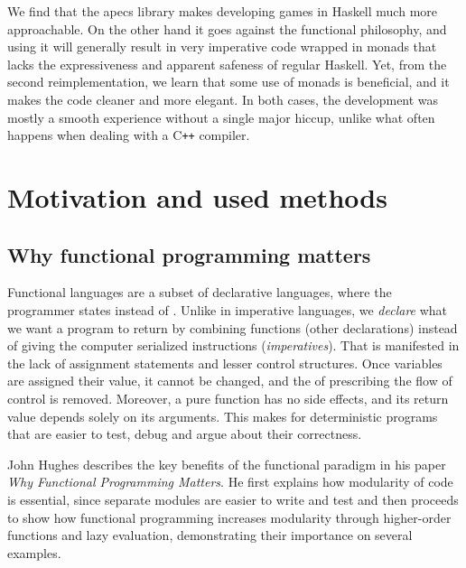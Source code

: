 \documentclass[
  digital, %
  color,   %
  table,   %
  oneside, %
  lof,     %
  lot,     %
]{fithesis3}
\newcommand{\cpp}{C\nolinebreak\texttt{+}\nolinebreak\texttt{+}}
\begin{document}
We find that the apecs library makes developing games
in Haskell much more approachable. On the other hand
it goes against the functional philosophy, and using it
will generally result in very imperative code wrapped in monads
that lacks the expressiveness and apparent safeness of regular Haskell.
Yet, from the second reimplementation, we learn that
some use of monads is beneficial, and it makes the code cleaner
and more elegant. In both cases, the development was
mostly a smooth experience without a single major hiccup,
unlike what often happens when dealing with a \cpp{} compiler.



\chapter{Motivation and used methods}
\label{chap:motivationandmethods}


\section{Why functional programming matters}
\label{sect:whyfpmatters}

Functional languages are a subset of declarative languages, where the
programmer states  instead of . Unlike in imperative languages,
we \emph{declare} what we want a program to return by combining functions (other declarations)
instead of giving the computer serialized instructions (\emph{imperatives}).
That is manifested in the lack of assignment statements and lesser control structures.
Once variables are assigned their value, it cannot be changed,
and the  of prescribing the flow of control
is removed.\cite{whyfpmatters} Moreover, a pure function has no side effects,
and its return value depends solely on its arguments. This makes for deterministic
programs that are easier to test, debug and argue about their correctness.

John Hughes describes the key benefits of the functional paradigm in his paper
\textit{Why Functional Programming Matters}.\cite{whyfpmatters} He first
explains how modularity of code is essential, since
separate modules are easier to write and test and then proceeds
to show how functional programming increases modularity
through higher-order functions and lazy evaluation, demonstrating
their importance on several examples.
\end{document}

